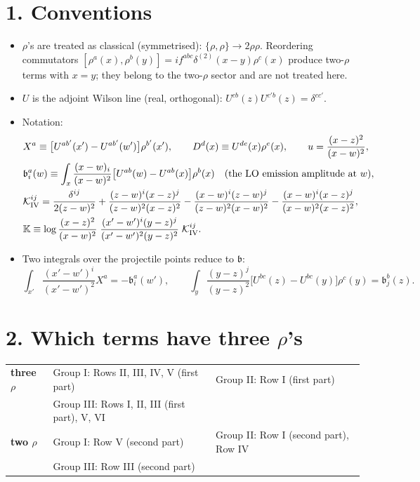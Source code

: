 \documentclass[10pt]{article}
\begin{document}
\section*{1. Conventions}
\begin{itemize}
\item $\rho$'s are treated as classical (symmetrised): $\{\rho,\rho\}\to2\rho\rho$. Reordering commutators $[\rho^{a}(x),\rho^{b}(y)]=if^{abc}\delta^{(2)}(x-y)\rho^{c}(x)$ produce two-$\rho$ terms with $x=y$; they belong to the two-$\rho$ sector and are not treated here.
\item $U$ is the adjoint Wilson line (real, orthogonal): $U^{cb}(z)U^{c'b}(z)=\delta^{cc'}$.
\item Notation:
\begin{align}
&X^{a}\equiv\big[U^{ab'}(x')-U^{ab'}(w')\big]\rho^{b'}(x'),\qquad D^{d}(x)\equiv U^{de}(x)\rho^{e}(x),\qquad u=\frac{(x-z)^{2}}{(x-w)^{2}},\notag\\
&\mathfrak b^{a}_{i}(w)\equiv\int_{x}\frac{(x-w)_{i}}{(x-w)^{2}}\big[U^{ab}(w)-U^{ab}(x)\big]\rho^{b}(x)\quad\text{(the LO emission amplitude at $w$)},\notag\\
&\mathcal K^{ij}_{\rm IV}=\frac{\delta^{ij}}{2(z-w)^{2}}+\frac{(z-w)^{i}(x-z)^{j}}{(z-w)^{2}(x-z)^{2}}-\frac{(x-w)^{i}(z-w)^{j}}{(z-w)^{2}(x-w)^{2}}-\frac{(x-w)^{i}(x-z)^{j}}{(x-w)^{2}(x-z)^{2}},\notag\\
&\mathbb K\equiv\log\frac{(x-z)^{2}}{(x-w)^{2}}\;\frac{(x'-w')^{i}(y-z)^{j}}{(x'-w')^{2}(y-z)^{2}}\;\mathcal K^{ij}_{\rm IV}.
\end{align}
\item Two integrals over the projectile points reduce to $\mathfrak b$:
\begin{equation}
\int_{x'}\frac{(x'-w')^{i}}{(x'-w')^{2}}X^{a}=-\mathfrak b^{a}_{i}(w'),\qquad\int_{y}\frac{(y-z)^{j}}{(y-z)^{2}}\big[U^{bc}(z)-U^{bc}(y)\big]\rho^{c}(y)=\mathfrak b^{b}_{j}(z).
\end{equation}
\end{itemize}

\section*{2. Which terms have three $\rho$'s}
\begin{tabular}{lll}
\textbf{three $\rho$} & Group I: Rows II, III, IV, V (first part) & Group II: Row I (first part)\\
 & Group III: Rows I, II, III (first part), V, VI & \\[2pt]
\textbf{two $\rho$} & Group I: Row V (second part) & Group II: Row I (second part), Row IV\\
 & Group III: Row III (second part) &
\end{tabular}
\end{document}

